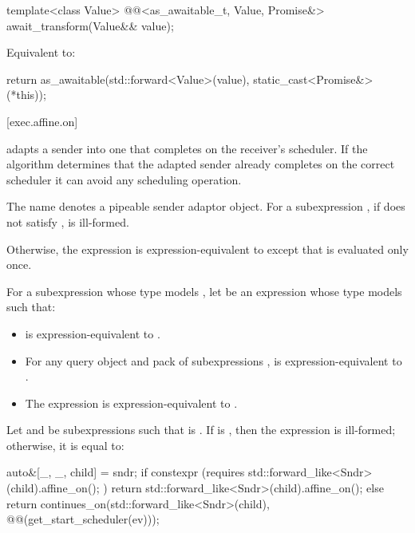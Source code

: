 %
\begin{itemdecl}
template<class Value>
@@<as_awaitable_t, Value, Promise&> await_transform(Value&& value);
\end{itemdecl}

\begin{itemdescr}
\pnum
\effects
Equivalent to:
\begin{codeblock}
return as_awaitable(std::forward<Value>(value), static_cast<Promise&>(*this));
\end{codeblock}
\end{itemdescr}

[exec.affine.on]{}

\pnum
{} adapts a sender into one that completes on
the receiver's scheduler.
If the algorithm determines that the adapted sender already completes
on the correct scheduler it can avoid any scheduling operation.

\pnum
The name  denotes a pipeable sender adaptor
object.
For a subexpression , if 
does not satisfy , 
is ill-formed.

\pnum
Otherwise, the expression  is
expression-equivalent to 
except that  is evaluated only once.

\pnum
For a subexpression  whose type models ,
let  be an expression 
whose type models  such that:
\begin{itemize}
\item
{} is expression-equivalent to .
\item
For any query object  and pack of subexpressions ,
 is expression-equivalent to
.
\item
The expression 
is expression-equivalent to .
\end{itemize}

\pnum
Let  and  be subexpressions
such that  is .
If  is ,
then the expression  is ill-formed;
otherwise, it is equal to:
\begin{codeblock}
auto&[_, _, child] = sndr;
if constexpr (requires{ std::forward_like<Sndr>(child).affine_on(); })
  return std::forward_like<Sndr>(child).affine_on();
else
  return continues_on(std::forward_like<Sndr>(child),
                      @@(get_start_scheduler(ev)));
\end{codeblock}

